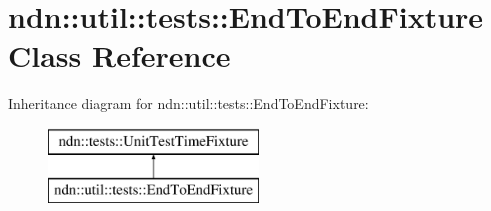 \hypertarget{classndn_1_1util_1_1tests_1_1EndToEndFixture}{}\section{ndn\+:\+:util\+:\+:tests\+:\+:End\+To\+End\+Fixture Class Reference}
\label{classndn_1_1util_1_1tests_1_1EndToEndFixture}
Inheritance diagram for ndn\+:\+:util\+:\+:tests\+:\+:End\+To\+End\+Fixture\+:\begin{figure}[H]
\begin{center}
\leavevmode
\includegraphics[height=2.000000cm]{classndn_1_1util_1_1tests_1_1EndToEndFixture}
\end{center}
\end{figure}
